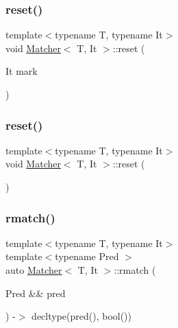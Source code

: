 \mbox{\label{class_matcher_abb67aa2acac25b34d80ffb2e64eef44c}} 
\subsubsection{\texorpdfstring{reset()}{reset()}\hspace{0.1cm}{\footnotesize\ttfamily [1/2]}}
{\footnotesize\ttfamily template$<$typename T, typename It$>$ \\
void \hyperlink{class_matcher}{Matcher}$<$ T, It $>$\+::reset (\begin{DoxyParamCaption}\item[{It}]{mark }\end{DoxyParamCaption})\hspace{0.3cm}{\ttfamily [inline]}}

\mbox{\label{class_matcher_a18de8d97996c28deb6ac787f2a0981a6}} 
\subsubsection{\texorpdfstring{reset()}{reset()}\hspace{0.1cm}{\footnotesize\ttfamily [2/2]}}
{\footnotesize\ttfamily template$<$typename T, typename It$>$ \\
void \hyperlink{class_matcher}{Matcher}$<$ T, It $>$\+::reset (\begin{DoxyParamCaption}{ }\end{DoxyParamCaption})\hspace{0.3cm}{\ttfamily [inline]}}

\mbox{\label{class_matcher_a016cf13b6cf1119494a9723fb9419fd4}} 
\subsubsection{\texorpdfstring{rmatch()}{rmatch()}\hspace{0.1cm}{\footnotesize\ttfamily [1/2]}}
{\footnotesize\ttfamily template$<$typename T, typename It$>$ \\
template$<$typename Pred $>$ \\
auto \hyperlink{class_matcher}{Matcher}$<$ T, It $>$\+::rmatch (\begin{DoxyParamCaption}\item[{Pred \&\&}]{pred }\end{DoxyParamCaption}) -\/$>$ decltype(pred(), bool())
  \hspace{0.3cm}{\ttfamily [inline]}}

